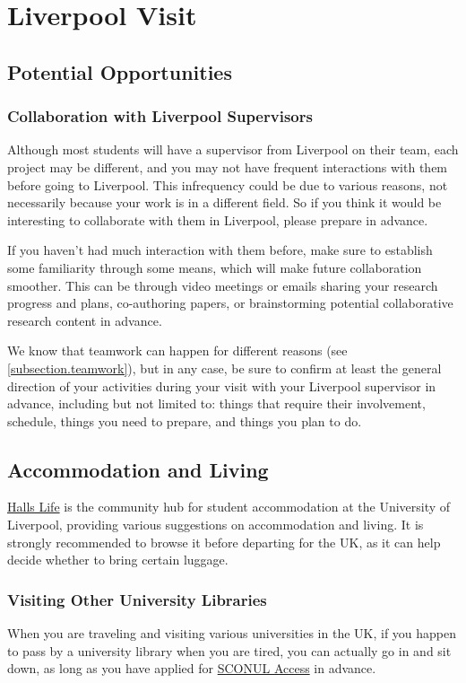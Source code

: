 \section{Liverpool Visit}
\label{section.UoL_visit}

\subsection{Potential Opportunities}
\subsubsection{Collaboration with Liverpool Supervisors}
Although most students will have a supervisor from Liverpool on their team, each project may be different, and you may not have frequent interactions with them before going to Liverpool. This infrequency could be due to various reasons, not necessarily because your work is in a different field. So if you think it would be interesting to collaborate with them in Liverpool, please prepare in advance.

If you haven't had much interaction with them before, make sure to establish some familiarity through some means, which will make future collaboration smoother. This can be through video meetings or emails sharing your research progress and plans, co-authoring papers, or brainstorming potential collaborative research content in advance.

We know that teamwork can happen for different reasons (see \ref{subsection.teamwork}), but in any case, be sure to confirm at least the general direction of your activities during your visit with your Liverpool supervisor in advance, including but not limited to: things that require their involvement, schedule, things you need to prepare, and things you plan to do.

\subsection{Accommodation and Living}
\href{https://hallslife.liverpool.ac.uk}{Halls Life} is the community hub for student accommodation at the University of Liverpool, providing various suggestions on accommodation and living. It is strongly recommended to browse it before departing for the UK, as it can help decide whether to bring certain luggage.

\subsubsection{Visiting Other University Libraries}
When you are traveling and visiting various universities in the UK, if you happen to pass by a university library when you are tired, you can actually go in and sit down, as long as you have applied for \href{https://access.sconul.ac.uk/sconul-access}{SCONUL Access} in advance.


